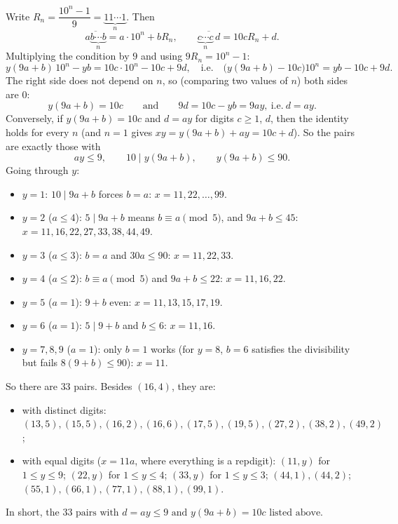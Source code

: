 Write $R_n=\dfrac{10^n-1}{9}=\underbrace{11\cdots1}_{n}$. Then
\[\overline{a\underbrace{b\cdots b}_{n}}=a\cdot10^n+bR_n,\qquad\overline{\underbrace{c\cdots c}_{n}\,d}=10cR_n+d.\]
Multiplying the condition by $9$ and using $9R_n=10^n-1$:
\[y(9a+b)\,10^n-yb=10c\cdot10^n-10c+9d,\quad\text{i.e.}\quad\bigl(y(9a+b)-10c\bigr)10^n=yb-10c+9d.\]
The right side does not depend on $n$, so (comparing two values of $n$) both sides are $0$:
\[y(9a+b)=10c\qquad\text{and}\qquad 9d=10c-yb=9ay,\ \text{i.e.}\ d=ay.\]
Conversely, if $y(9a+b)=10c$ and $d=ay$ for digits $c\ge1$, $d$, then the identity holds for every $n$ (and $n=1$ gives $xy=y(9a+b)+ay=10c+d$). So the pairs are exactly those with
\[ay\le9,\qquad 10\mid y(9a+b),\qquad y(9a+b)\le90.\]
Going through $y$:
\begin{itemize}
\item $y=1$: $10\mid9a+b$ forces $b=a$: $x=11,22,\dots,99$.
\item $y=2$ ($a\le4$): $5\mid9a+b$ means $b\equiv a\pmod5$, and $9a+b\le45$: $x=11,16,22,27,33,38,44,49$.
\item $y=3$ ($a\le3$): $b=a$ and $30a\le90$: $x=11,22,33$.
\item $y=4$ ($a\le2$): $b\equiv a\pmod5$ and $9a+b\le22$: $x=11,16,22$.
\item $y=5$ ($a=1$): $9+b$ even: $x=11,13,15,17,19$.
\item $y=6$ ($a=1$): $5\mid9+b$ and $b\le6$: $x=11,16$.
\item $y=7,8,9$ ($a=1$): only $b=1$ works (for $y=8$, $b=6$ satisfies the divisibility but fails $8(9+b)\le90$): $x=11$.
\end{itemize}
So there are $33$ pairs. Besides $(16,4)$, they are:
\begin{itemize}
\item with distinct digits: $(13,5),(15,5),(16,2),(16,6),(17,5),(19,5),(27,2),(38,2),(49,2)$;
\item with equal digits ($x=11a$, where everything is a repdigit): $(11,y)$ for $1\le y\le9$; $(22,y)$ for $1\le y\le4$; $(33,y)$ for $1\le y\le3$; $(44,1),(44,2)$; $(55,1),(66,1),(77,1),(88,1),(99,1)$.
\end{itemize}
In short, $\boxed{\text{the }33\text{ pairs with }d=ay\le9\text{ and }y(9a+b)=10c\text{ listed above}}$.
